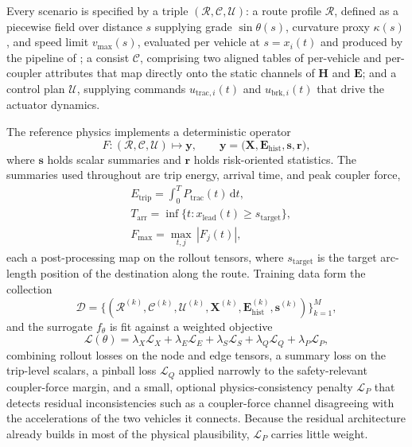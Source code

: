 \documentclass[numbered]{trbunofficial}
\begin{document}
Every scenario is specified by a triple $(\mathcal{R}, \mathcal{C}, \mathcal{U})$: a route profile $\mathcal{R}$, defined as a piecewise field over distance $s$ supplying grade $\sin\theta(s)$, curvature proxy $\kappa(s)$, and speed limit $v_{\max}(s)$, evaluated per vehicle at $s = x_i(t)$ and produced by the pipeline of ; a consist $\mathcal{C}$, comprising two aligned tables of per-vehicle and per-coupler attributes that map directly onto the static channels of $\mathbf{H}$ and $\mathbf{E}$; and a control plan $\mathcal{U}$, supplying commands $u_{\mathrm{trac},i}(t)$ and $u_{\mathrm{brk},i}(t)$ that drive the actuator dynamics.

The reference physics implements a deterministic operator
\begin{equation}
  F : (\mathcal{R}, \mathcal{C}, \mathcal{U}) \mapsto \mathbf{y}, \qquad \mathbf{y} = \bigl(\mathbf{X}, \mathbf{E}_{\mathrm{hist}}, \mathbf{s}, \mathbf{r}\bigr),
  \label{eq:operator}
\end{equation}
where $\mathbf{s}$ holds scalar summaries and $\mathbf{r}$ holds risk-oriented statistics. The summaries used throughout are trip energy, arrival time, and peak coupler force,
\begin{align}
  & E_{\mathrm{trip}} = \int_0^{T} P_{\mathrm{trac}}(t)\,\mathrm{d}t, \\
  & T_{\mathrm{arr}} = \inf\{t : x_{\mathrm{lead}}(t) \ge s_{\mathrm{target}}\}, \\
  & F_{\max} = \max_{t,j}\,|F_j(t)|,
\end{align}
each a post-processing map on the rollout tensors, where $s_{\mathrm{target}}$ is the target arc-length position of the destination along the route. Training data form the collection
\begin{equation}
\mathcal{D} = \{(\mathcal{R}^{(k)}, \mathcal{C}^{(k)}, \mathcal{U}^{(k)}, \mathbf{X}^{(k)}, \mathbf{E}_{\mathrm{hist}}^{(k)}, \mathbf{s}^{(k)})\}_{k=1}^{M},
\end{equation}
and the surrogate $f_\theta$ is fit against a weighted objective
\begin{equation}
  \mathcal{L}(\theta) = \lambda_X \mathcal{L}_X + \lambda_E \mathcal{L}_E + \lambda_S \mathcal{L}_S + \lambda_Q \mathcal{L}_{Q} + \lambda_P \mathcal{L}_{P},
  \label{eq:loss}
\end{equation}
combining rollout losses on the node and edge tensors, a summary loss on the trip-level scalars, a pinball loss $\mathcal{L}_Q$ applied narrowly to the safety-relevant coupler-force margin, and a small, optional physics-consistency penalty $\mathcal{L}_P$ that detects residual inconsistencies such as a coupler-force channel disagreeing with the accelerations of the two vehicles it connects. Because the residual architecture already builds in most of the physical plausibility, $\mathcal{L}_P$ carries little weight.
\end{document}
